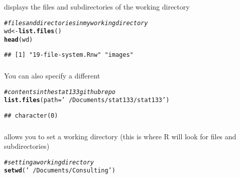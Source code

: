 \documentclass[12pt]{beamer}\usepackage[]{graphicx}\usepackage[]{color}
\makeatletter
\newcommand{\hlstr}[1]{\textcolor[rgb]{0.192,0.494,0.8}{#1}}%
\newcommand{\hlcom}[1]{\textcolor[rgb]{0.678,0.584,0.686}{\textit{#1}}}%
\newcommand{\hlstd}[1]{\textcolor[rgb]{0.345,0.345,0.345}{#1}}%
\newcommand{\hlkwb}[1]{\textcolor[rgb]{0.69,0.353,0.396}{#1}}%
\newcommand{\hlkwc}[1]{\textcolor[rgb]{0.333,0.667,0.333}{#1}}%
\newcommand{\hlkwd}[1]{\textcolor[rgb]{0.737,0.353,0.396}{\textbf{#1}}}%
\newenvironment{kframe}{%
 \def\at@end@of@kframe{}%
 \ifinner\ifhmode%
  \def\at@end@of@kframe{\end{minipage}}%
  \begin{minipage}{\columnwidth}%
 \fi\fi%
 \def\FrameCommand##1{\hskip\@totalleftmargin \hskip-\fboxsep
 \colorbox{shadecolor}{##1}\hskip-\fboxsep
     \hskip-\linewidth \hskip-\@totalleftmargin \hskip\columnwidth}%
 \MakeFramed {\advance\hsize-\width
   \@totalleftmargin\z@ \linewidth\hsize
   \@setminipage}}%
 {\par\unskip\endMakeFramed%
 \at@end@of@kframe}
\newenvironment{knitrout}{}{} %
\makeatother
\begin{document}

\begin{frame}[fragile]
\frametitle{}

{\hilit {}} displays the files and subdirectories of the working directory
\begin{knitrout}\scriptsize
{}\color{fgcolor}\begin{kframe}
\begin{alltt}
\hlcom{# files and directories in my working directory}
\hlstd{wd} \hlkwb{<-} \hlkwd{list.files}\hlstd{()}
\hlkwd{head}\hlstd{(wd)}
\end{alltt}
\begin{verbatim}
## [1] "19-file-system.Rnw" "images"
\end{verbatim}
\end{kframe}
\end{knitrout}

\end{frame}


\begin{frame}[fragile]
\frametitle{}

You can also specify a different 
\begin{knitrout}\footnotesize
{}\color{fgcolor}\begin{kframe}
\begin{alltt}
\hlcom{# contents in the stat133 github repo}
\hlkwd{list.files}\hlstd{(}\hlkwc{path} \hlstd{=} \hlstr{'~/Documents/stat133/stat133'}\hlstd{)}
\end{alltt}
\begin{verbatim}
## character(0)
\end{verbatim}
\end{kframe}
\end{knitrout}

\end{frame}


\begin{frame}[fragile]
\frametitle{}

{\hilit {}} allows you to set a working directory (this is where R will look for files and subdirectories)
\begin{knitrout}\footnotesize
{}\color{fgcolor}\begin{kframe}
\begin{alltt}
\hlcom{# setting a working directory}
\hlkwd{setwd}\hlstd{(}\hlstr{'~/Documents/Consulting'}\hlstd{)}
\end{alltt}
\end{kframe}
\end{knitrout}

\end{frame}
\end{document}
